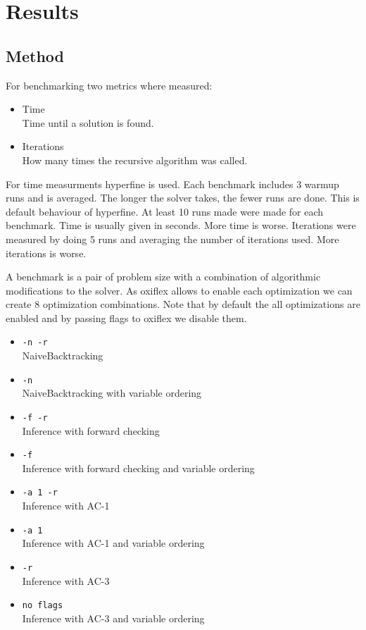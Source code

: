
\chapter{Results}

\section{Method}

For benchmarking two metrics where measured:

\begin{itemize}
	\item Time \\
	      Time until a solution is found.
	\item Iterations \\
	      How many times the recursive algorithm was called.
\end{itemize}

For time measurments hyperfine is used. Each benchmark includes 3 warmup runs and is averaged. The longer the solver takes, the fewer runs are done. This is default behaviour of hyperfine. At least 10 runs made were made for each benchmark. Time is usually given in seconds. More time is worse. Iterations were measured by doing 5 runs and averaging the number of iterations used. More iterations is worse.

A benchmark is a pair of problem size with a combination of algorithmic modifications to the solver. As oxiflex allows to enable each optimization we can create 8 optimization combinations. Note that by default the all optimizations are enabled and by passing flags to oxiflex we disable them.

\begin{itemize}
	\item \verb|-n -r| \\
	      NaiveBacktracking
	\item \verb|-n| \\
	      NaiveBacktracking with variable ordering
	\item \verb|-f -r| \\
	      Inference with forward checking
	\item \verb|-f| \\
	      Inference with forward checking and variable ordering
	\item \verb|-a 1 -r| \\
	      Inference with AC-1
	\item \verb|-a 1| \\
	      Inference with AC-1 and variable ordering
	\item \verb|-r| \\
	      Inference with AC-3
	\item \verb|no flags| \\
	      Inference with AC-3 and variable ordering
\end{itemize}

